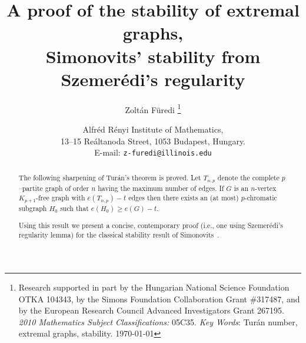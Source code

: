 \documentclass[11pt]{article}
\begin{document}
\title{{%
A proof of the stability of extremal graphs,\\
 Simonovits' stability from Szemer\'edi's regularity}}

\author{Zolt\'an F\"uredi
\thanks{%
Research supported in part by the Hungarian National Science Foundation OTKA 104343,
 by the Simons Foundation Collaboration Grant \#317487,
and by the European Research Council Advanced Investigators Grant 267195.
\newline\indent
{\it 2010 Mathematics Subject Classifications:}
05C35. \hfill \jobname
\newline\indent
{\it Key Words}:  Tur\'an number,  extremal graphs, stability.  \hfill\today
}
}
\date{Alfr\'ed R\'enyi Institute of Mathematics,\\ 13--15 Re\'altanoda Street, 1053 Budapest, Hungary. \\
E-mail: {\tt z-furedi@illinois.edu}}





\maketitle





\maketitle

\begin{abstract}
The following sharpening of Tur\'an's theorem is proved.
Let $T_{n,p}$ denote the complete $p$--partite graph of order $n$ having the maximum number of edges.
If $G$ is an $n$-vertex $K_{p+1}$-free graph with
  $e(T_{n,p})-t$ edges then there exists an (at most) $p$-chromatic subgraph $H_0$ such that
  $e(H_0)\geq e(G)-t$.

Using this result we present a concise, contemporary proof (i.e., one using
Szemer\'edi's regularity lemma) for the classical stability result
of Simonovits~\cite{Sim_Tihany}.



\end{abstract}
\end{document}
